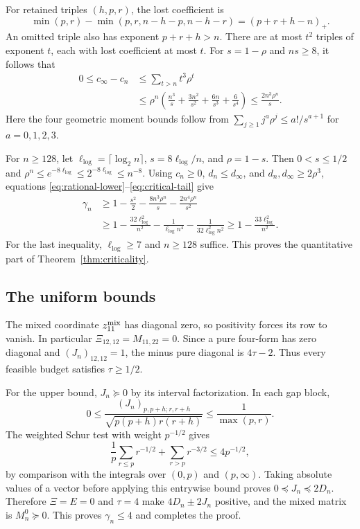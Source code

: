 For retained triples $(h,p,r)$, the lost coefficient is
\[
 \min(p,r)-\min(p,r,n-h-p,n-h-r)=(p+r+h-n)_+.
\]
An omitted triple also has exponent $p+r+h>n$. There are at most $t^2$
triples of exponent $t$, each with lost coefficient at most $t$. For
$s=1-\rho$ and $ns\ge8$, it follows that
\begin{equation}\label{eq:critical-tail}
\begin{split}
 0\le c_\infty-c_n
 &\le\sum_{t>n}t^3\rho^t\\
 &\le\rho^n\left(\frac{n^3}{s}+\frac{3n^2}{s^2}
                     +\frac{6n}{s^3}+\frac6{s^4}\right)
 \le\frac{2n^3\rho^n}{s}.
\end{split}
\end{equation}
Here the four geometric moment bounds follow from
$\sum_{j\ge1}j^a\rho^j\le a!/s^{a+1}$ for $a=0,1,2,3$.

For $n\ge128$, let $\ell_{\log}=\lceil\log_2n\rceil$, $s=8\ell_{\log}/n$, and
$\rho=1-s$. Then $0<s\le1/2$ and
$\rho^n\le e^{-8\ell_{\log}}\le2^{-8\ell_{\log}}\le n^{-8}$.
Using $c_n\ge0$, $d_n\le d_\infty$, and
$d_n,d_\infty\ge2\rho^3$, equations
\eqref{eq:rational-lower}--\eqref{eq:critical-tail} give
\[
\begin{split}
 \gamma_n
 &\ge1-\frac{s^2}{2}-\frac{8n^3\rho^n}{s}
                       -\frac{2n^4\rho^n}{s^2}\\
 &\ge1-\frac{32\ell_{\log}^2}{n^2}-\frac1{\ell_{\log}n^4}-\frac1{32\ell_{\log}^2n^2}
 \ge1-\frac{33\ell_{\log}^2}{n^2}.
\end{split}
\]
For the last inequality, $\ell_{\log}\ge7$ and $n\ge128$ suffice. This proves
the quantitative part of Theorem~\ref{thm:criticality}.

\subsection{The uniform bounds}
The mixed coordinate $z^{\rm mix}_{11}$ has diagonal zero, so positivity forces
its row to vanish. In particular $\Xi_{12,12}=M_{11,22}=0$.
Since a pure four-form has zero diagonal and $(J_n)_{12,12}=1$, the minus
pure diagonal is $4\tau-2$. Thus every feasible budget satisfies
$\tau\ge1/2$.

For the upper bound, $J_n\succeq0$ by its interval factorization.
In each gap block,
\[
 0\le\frac{(J_n)_{p,p+h;r,r+h}}{\sqrt{p(p+h)r(r+h)}}
          \le\frac1{\max(p,r)}.
\]
The weighted Schur test with weight $p^{-1/2}$ gives
\[
 \frac1p\sum_{r\le p}r^{-1/2}+\sum_{r>p}r^{-3/2}
                 \le4p^{-1/2},
\]
by comparison with the integrals over $(0,p)$ and $(p,\infty)$.
Taking absolute values of a vector before applying this entrywise bound
proves $0\preceq J_n\preceq2D_n$. Therefore $\Xi=E=0$ and $\tau=4$
make $4D_n\pm2J_n$ positive, and the mixed matrix is $M_n^0\succeq0$.
This proves $\gamma_n\le4$ and completes the proof.
